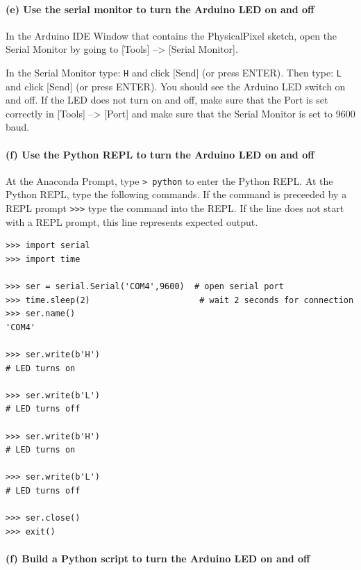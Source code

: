 \documentclass[11pt]{article}
\begin{document}
    \hypertarget{e-use-the-serial-monitor-to-turn-the-arduino-led-on-and-off}{%
\paragraph{(e) Use the serial monitor to turn the Arduino LED on and
off}\label{e-use-the-serial-monitor-to-turn-the-arduino-led-on-and-off}}

In the Arduino IDE Window that contains the PhysicalPixel sketch, open
the Serial Monitor by going to {[}Tools{]} --\textgreater{} {[}Serial
Monitor{]}.

In the Serial Monitor type: \texttt{H} and click {[}Send{]} (or press
ENTER). Then type: \texttt{L} and click {[}Send{]} (or press ENTER). You
should see the Arduino LED switch on and off. If the LED does not turn
on and off, make sure that the Port is set correctly in {[}Tools{]}
--\textgreater{} {[}Port{]} and make sure that the Serial Monitor is set
to 9600 baud.

    \hypertarget{f-use-the-python-repl-to-turn-the-arduino-led-on-and-off}{%
\paragraph{(f) Use the Python REPL to turn the Arduino LED on and
off}\label{f-use-the-python-repl-to-turn-the-arduino-led-on-and-off}}

At the Anaconda Prompt, type \texttt{\textgreater{}\ python} to enter
the Python REPL. At the Python REPL, type the following commands. If the
command is preceeded by a REPL prompt
\texttt{\textgreater{}\textgreater{}\textgreater{}} type the command
into the REPL. If the line does not start with a REPL prompt, this line
represents expected output.

\begin{verbatim}
>>> import serial
>>> import time

>>> ser = serial.Serial('COM4',9600)  # open serial port
>>> time.sleep(2)                      # wait 2 seconds for connection
>>> ser.name()
'COM4'

>>> ser.write(b'H')
# LED turns on

>>> ser.write(b'L')
# LED turns off

>>> ser.write(b'H')
# LED turns on

>>> ser.write(b'L')
# LED turns off

>>> ser.close()
>>> exit()
\end{verbatim}

    \hypertarget{f-build-a-python-script-to-turn-the-arduino-led-on-and-off}{%
\paragraph{(f) Build a Python script to turn the Arduino LED on and
off}\label{f-build-a-python-script-to-turn-the-arduino-led-on-and-off}}
\end{document}
